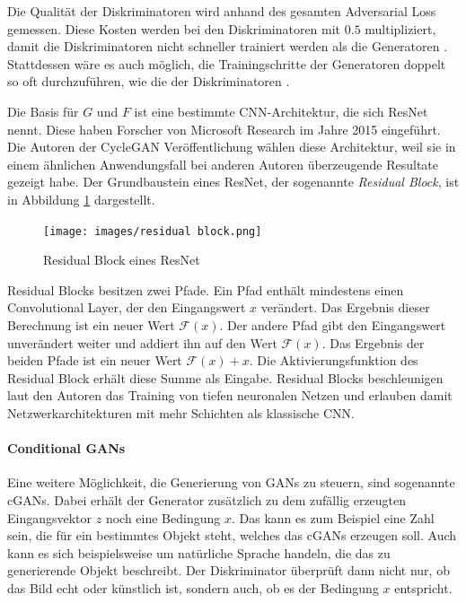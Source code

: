 Die Qualität der Diskriminatoren wird anhand des gesamten Adversarial Loss gemessen. Diese Kosten werden bei den Diskriminatoren mit $0.5$ multipliziert, damit die Diskriminatoren nicht schneller trainiert werden als die Generatoren \cite{cyclegan-tutorial}. Stattdessen wäre es auch möglich, die Trainingschritte der Generatoren doppelt so oft durchzuführen, wie die der Diskriminatoren \cite{visualApproach}.

Die Basis für $G$ und $F$ ist eine bestimmte \ac{CNN}-Architektur, die sich \ac{ResNet} nennt. Diese haben Forscher von Microsoft Research im Jahre 2015 eingeführt. Die Autoren der \ac{CycleGAN} Veröffentlichung wählen diese Architektur, weil sie in einem ähnlichen Anwendungsfall bei anderen Autoren überzeugende Resultate gezeigt habe. Der Grundbaustein eines \ac{ResNet}, der sogenannte \emph{Residual Block}, ist in Abbildung \ref{fig:residual-block} dargestellt. \cite{resnet} \Cite{cycleGAN}

\begin{figure}[h]
   \centering
   \texttt{[image: images/residual block.png]}
   \caption{Residual Block eines ResNet \cite{resnet}}
   \label{fig:residual-block}
\end{figure}

Residual Blocks besitzen zwei Pfade. Ein Pfad enthält mindestens einen Convolutional Layer, der den Eingangswert $x$ verändert. Das Ergebnis dieser Berechnung ist ein neuer Wert $\mathcal{F}(x)$. Der andere Pfad gibt den Eingangswert unverändert weiter und addiert ihn auf den Wert $\mathcal{F}(x)$. Das Ergebnis der beiden Pfade ist ein neuer Wert $\mathcal{F}(x) + x$. Die Aktivierungsfunktion des Residual Block erhält diese Summe als Eingabe. Residual Blocks beschleunigen laut den Autoren das Training von tiefen neuronalen Netzen und erlauben damit Netzwerkarchitekturen mit mehr Schichten als klassische \ac{CNN}. \cite{resnet}

\paragraph{Conditional GANs}
Eine weitere Möglichkeit, die Generierung von \acp{GAN} zu steuern, sind sogenannte \acp{cGAN}. Dabei erhält der Generator zusätzlich zu dem zufällig erzeugten Eingangsvektor $z$ noch eine Bedingung $x$. Das kann es zum Beispiel eine Zahl sein, die für ein bestimmtes Objekt steht, welches das \acp{cGAN} erzeugen soll. Auch kann es sich beispielsweise um natürliche Sprache handeln, die das zu generierende Objekt beschreibt. Der Diskriminator überprüft dann nicht nur, ob das Bild echt oder künstlich ist, sondern auch, ob es der Bedingung $x$ entspricht.

